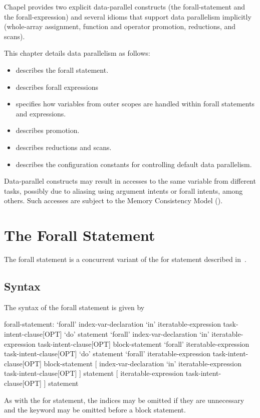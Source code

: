 \label{Data_Parallelism}

Chapel provides two explicit data-parallel constructs (the
forall-statement and the forall-expression) and several idioms that
support data parallelism implicitly (whole-array assignment, function
and operator promotion, reductions, and scans).

This chapter details data parallelism as follows:
\begin{itemize}
\item {} describes the forall statement.
\item {} describes forall expressions
\item {} specifies how variables from outer scopes
are handled within forall statements and expressions.
\item {} describes promotion.
\item {} describes reductions and scans.
\item {} describes the configuration constants for
controlling default data parallelism.
\end{itemize}       

Data-parallel constructs may result in accesses to the same variable
from different tasks, possibly due to aliasing using
 argument intents or forall intents, among others.
Such accesses are subject to the Memory Consistency Model
().

\section{The Forall Statement}
\label{Forall}

The forall statement is a concurrent variant of the for statement
described in~.

\subsection{Syntax}
\label{forall_syntax}

The syntax of the forall statement is given by
\begin{syntax}
forall-statement:
  `forall' index-var-declaration `in' iteratable-expression task-intent-clause[OPT] `do' statement
  `forall' index-var-declaration `in' iteratable-expression task-intent-clause[OPT] block-statement
  `forall' iteratable-expression task-intent-clause[OPT] `do' statement
  `forall' iteratable-expression task-intent-clause[OPT] block-statement
  [ index-var-declaration `in' iteratable-expression task-intent-clause[OPT] ] statement
  [ iteratable-expression task-intent-clause[OPT] ] statement
\end{syntax}
As with the for statement, the indices may be omitted if they are
unnecessary and the  keyword may be omitted before a block
statement.

